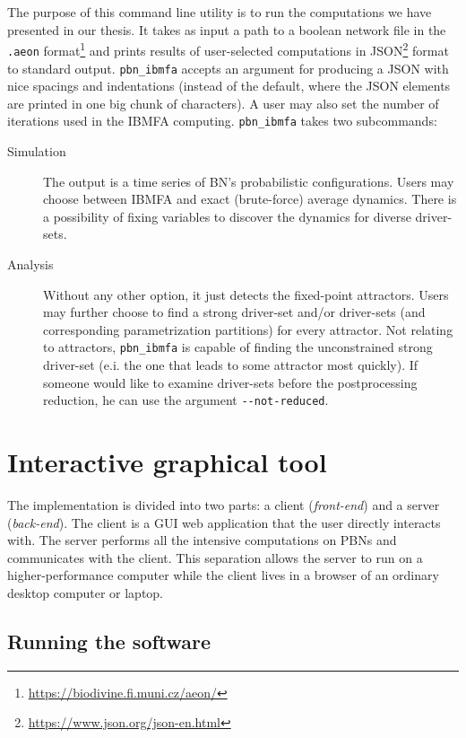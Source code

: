 \documentclass[
	digital, oneside, nosansbold, nocolorbold, nolot, nolof
]{fithesis4}
\theoremstyle{definition}
\theoremstyle{definition}
\begin{document}
The purpose of this command line utility is to run the computations we have presented in our thesis. It takes as input a path to a boolean network file in the \texttt{.aeon} format\footnote{\url{https://biodivine.fi.muni.cz/aeon/}} and prints results of user-selected computations in JSON\footnote{\url{https://www.json.org/json-en.html}} format to standard output. \texttt{pbn\_ibmfa} accepts an argument for producing a JSON with nice spacings and indentations (instead of the default, where the JSON elements are printed in one big chunk of characters). A user may also set the number of iterations used in the IBMFA computing. \texttt{pbn\_ibmfa} takes two subcommands:
\begin{description}
\item[Simulation] The output is a time series of BN's probabilistic
    configurations. Users may choose between IBMFA and exact (brute-force)
    average dynamics. There is a possibility of fixing variables to discover
    the dynamics for diverse driver-sets.
\item[Analysis] Without any other option, it just detects the fixed-point
    attractors. Users may further choose to find a strong driver-set and/or
    driver-sets (and corresponding parametrization partitions) for every
    attractor. Not relating to attractors, \texttt{pbn\_ibmfa} is capable of
    finding the unconstrained strong driver-set (e.i. the one that leads to
    some attractor most quickly). If someone would like to examine driver-sets
    before the postprocessing reduction, he can use the argument
    \verb|--not-reduced|.
\end{description}

\section{Interactive graphical tool}

The implementation is divided into two parts: a client (\emph{front-end}) and a
server (\emph{back-end}). The client is a GUI web application that the user
directly interacts with. The server performs all the intensive computations on
PBNs and communicates with the client. This separation allows the server to run
on a higher-performance computer while the client lives in a browser of an
ordinary desktop computer or laptop.

\subsection{Running the software}
\end{document}
